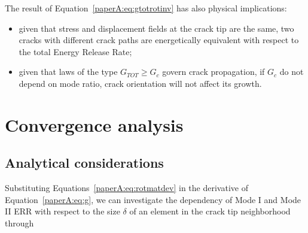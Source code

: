 The result of Equation~\ref{paperA:eq:gtotrotinv} has also physical implications:

\begin{itemize}[label={--}]
\item given that stress and displacement fields at the crack tip are the same, two cracks with different crack paths are energetically equivalent with respect to the total Energy Release Rate;
\item given that laws of the type $G_{TOT}\geq G_{c}$ govern crack propagation, if $G_{c}$ do not depend on mode ratio, crack orientation will not affect its growth.
\end{itemize}

\section{Convergence analysis}

\subsection{Analytical considerations}

Substituting Equations~\ref{paperA:eq:rotmatdev} in the derivative of Equation~\ref{paperA:eq:g}, we can investigate the dependency of Mode I and Mode II ERR with respect to the size $\delta$ of an element in the crack tip neighborhood through

